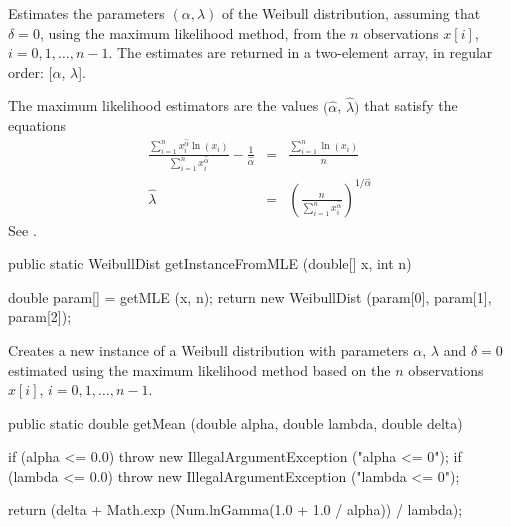 \begin{tabb}
   Estimates the parameters $(\alpha, \lambda)$ of the Weibull  distribution,
   assuming that $\delta = 0$,
    using the maximum likelihood method, from the $n$ observations
   $x[i]$, $i = 0, 1, \ldots, n-1$. The estimates are returned in a two-element
    array, in regular order: [$\alpha$, $\lambda$].
   \begin{detailed}
   The maximum likelihood estimators are the values
   $(\hat{\alpha}$, $\hat{\lambda})$ that satisfy the equations
   \begin{eqnarray*}
      \frac{\sum_{i=1}^{n} x_i^{\hat{\alpha}} \ln(x_i)}{\sum_{i=1}^{n}
  x_i^{\hat{\alpha}}} - \frac{1}{\hat{\alpha}} & = & \frac{\sum_{i=1}^{n} \ln(x_i)}{n}\\
      \hat{\lambda} & = & \left( \frac{n}{\sum_{i=1}^{n} x_i^{\hat{\alpha}}}
    \right)^{1/\hat{\alpha}}
   \end{eqnarray*}
  See \cite[page 303]{sLAW00a}.
   \end{detailed}
\end{tabb}
\begin{htmlonly}
\end{htmlonly}
\begin{code}

   public static WeibullDist getInstanceFromMLE (double[] x, int n)\begin{hide} {
      double param[] = getMLE (x, n);
      return new WeibullDist (param[0], param[1], param[2]);
   }\end{hide}
\end{code}
\begin{tabb}
   Creates a new instance of a Weibull distribution with parameters $\alpha$,
   $\lambda$ and $\delta = 0$
   estimated using the maximum likelihood method based on the $n$ observations
   $x[i]$, $i = 0, 1, \ldots, n-1$.
\end{tabb}
\begin{htmlonly}
\end{htmlonly}
\begin{code}

   public static double getMean (double alpha, double lambda, double delta)\begin{hide} {
      if (alpha <= 0.0)
        throw new IllegalArgumentException ("alpha <= 0");
      if (lambda <= 0.0)
        throw new IllegalArgumentException ("lambda <= 0");

      return (delta + Math.exp (Num.lnGamma(1.0 + 1.0 / alpha)) / lambda);
   }\end{hide}
\end{code}
